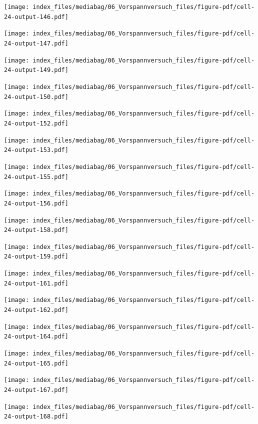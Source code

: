 \documentclass[
  11pt,
  letterpaper,
]{scrreprt}
\begin{document}
\newpage{}

\texttt{[image: index\_files/mediabag/06\_Vorspannversuch\_files/figure-pdf/cell-24-output-146.pdf]}

\texttt{[image: index\_files/mediabag/06\_Vorspannversuch\_files/figure-pdf/cell-24-output-147.pdf]}

\newpage{}

\texttt{[image: index\_files/mediabag/06\_Vorspannversuch\_files/figure-pdf/cell-24-output-149.pdf]}

\texttt{[image: index\_files/mediabag/06\_Vorspannversuch\_files/figure-pdf/cell-24-output-150.pdf]}

\newpage{}

\texttt{[image: index\_files/mediabag/06\_Vorspannversuch\_files/figure-pdf/cell-24-output-152.pdf]}

\texttt{[image: index\_files/mediabag/06\_Vorspannversuch\_files/figure-pdf/cell-24-output-153.pdf]}

\newpage{}

\texttt{[image: index\_files/mediabag/06\_Vorspannversuch\_files/figure-pdf/cell-24-output-155.pdf]}

\texttt{[image: index\_files/mediabag/06\_Vorspannversuch\_files/figure-pdf/cell-24-output-156.pdf]}

\newpage{}

\texttt{[image: index\_files/mediabag/06\_Vorspannversuch\_files/figure-pdf/cell-24-output-158.pdf]}

\texttt{[image: index\_files/mediabag/06\_Vorspannversuch\_files/figure-pdf/cell-24-output-159.pdf]}

\newpage{}

\texttt{[image: index\_files/mediabag/06\_Vorspannversuch\_files/figure-pdf/cell-24-output-161.pdf]}

\texttt{[image: index\_files/mediabag/06\_Vorspannversuch\_files/figure-pdf/cell-24-output-162.pdf]}

\newpage{}

\texttt{[image: index\_files/mediabag/06\_Vorspannversuch\_files/figure-pdf/cell-24-output-164.pdf]}

\texttt{[image: index\_files/mediabag/06\_Vorspannversuch\_files/figure-pdf/cell-24-output-165.pdf]}

\newpage{}

\texttt{[image: index\_files/mediabag/06\_Vorspannversuch\_files/figure-pdf/cell-24-output-167.pdf]}

\texttt{[image: index\_files/mediabag/06\_Vorspannversuch\_files/figure-pdf/cell-24-output-168.pdf]}
\end{document}
